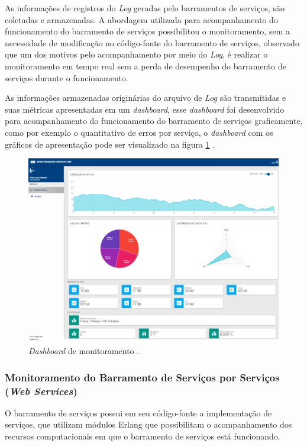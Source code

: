 As informações de registros do \textit{Log} geradas pelo barramentos de serviços, são coletadas e armazenadas. A abordagem utilizada para acompanhamento do funcionamento do barramento de serviços possibilitou o monitoramento, sem a necessidade de modificação no código-fonte do barramento de serviços, observado que um dos motivos pelo acompanhamento por meio do \textit{Log}, é realizar o monitoramento em tempo real sem a perda de desempenho  do barramento de serviços durante o funcionamento. 

As informações armazenadas originárias do arquivo de \textit{Log} são transmitidas e suas métricas apresentadas em um \textit{dashboard}, esse \textit{dashboard} foi desenvolvido para acompanhamento do funcionamento do barramento de serviços graficamente, como por exemplo o quantitativo de erros por serviço, o \textit{dashboard} com os gráficos de apresentação pode ser visualizado na figura \ref{fun:fig:dashboardS} \cite{filgueirasmonitoramento}.

\begin{figure}[H]
	\begin{center}
	\includegraphics[scale = 0.70]{img/dashboard.jpg}
		\caption{\textit{Dashboard} de monitoramento \cite{filgueirasmonitoramento}.}
		\label{fun:fig:dashboardS}
	\end{center}
\end{figure}

\subsubsection{Monitoramento do Barramento de Serviços por Serviços (\textit{Web Services})}
O barramento de serviços possui em seu código-fonte a implementação de serviços, que utilizam módulos Erlang que possibilitam o acompanhamento dos recursos computacionais em que o barramento de serviços está funcionando. 

